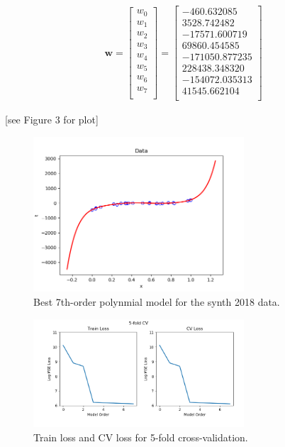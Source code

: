 \documentclass[10pt]{article}
\begin{document}
\begin{itemize}
\begin{eqnarray*}
\mathbf{w} = 
\begin{bmatrix}
    w_0\\[0.3em]
    w_1\\[0.3em]
    w_2\\[0.3em]
    w_3\\[0.3em]
    w_4\\[0.3em]
    w_5\\[0.3em]
    w_6\\[0.3em]
    w_7\\[0.3em]
\end{bmatrix} =
\begin{bmatrix}
    -460.632085\\[0.3em]
    3528.742482\\[0.3em]
    -17571.600719\\[0.3em]
    69860.454585\\[0.3em]
    -171050.877235\\[0.3em]
    228438.348320\\[0.3em]
    -154072.035313\\[0.3em]
    41545.662104\\[0.3em]
\end{bmatrix}
\end{eqnarray*}

\begin{center}
[see Figure 3 for plot]
\end{center}

\begin{figure}
\centering
\includegraphics[width=0.7\textwidth]{problem4_1.png}
\caption{\label{fig:4.1}Best 7th-order polynmial model for the synth 2018 data.}
\end{figure}

\begin{figure}
\centering
\includegraphics[width=0.7\textwidth]{5-fold.png}
\caption{\label{fig:4.2}Train loss and CV loss for 5-fold cross-validation.}
\end{figure}


\end{itemize}
\end{document}
